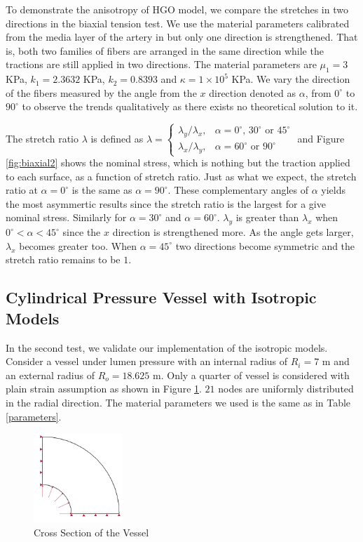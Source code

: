 To demonstrate the anisotropy of HGO model, we compare the stretches in two directions in the biaxial tension test. We use the material parameters calibrated from the media layer of the artery in \cite{Holzapfel2} but only one direction is strengthened. That is, both two families of fibers are arranged in the same direction while the tractions are still applied in two directions. The material parameters are $\mu_1 = 3$ KPa, $k_1 = 2.3632$ KPa, $k_2 = 0.8393$ and $\kappa = 1 \times 10^5$ KPa. We vary the direction of the fibers measured by the angle from the $x$ direction denoted as $\alpha$, from $0^\circ$ to $90^\circ$ to observe the trends qualitatively as there exists no theoretical solution to it. 

The stretch ratio $\lambda$ is defined as $\lambda = 
\begin{cases}
	\lambda_y/\lambda_x, & \text{$\alpha = 0^\circ$, $30^\circ$ or $45^\circ$} \\
	\lambda_x/\lambda_y, & \text{$\alpha = 60^\circ$ or $90^\circ$}
\end{cases}
$ 
and Figure \ref{fig:biaxial2} shows the nominal stress, which is nothing but the traction applied to each surface, as a function of stretch ratio. Just as what we expect, the stretch ratio at $\alpha = 0^\circ$ is the same as $\alpha = 90^\circ$. These complementary angles of $\alpha$ yields the most asymmertic results since the stretch ratio is the largest for a give nominal stress. Similarly for $\alpha = 30^\circ$ and $\alpha = 60^\circ$. 
$\lambda_y$ is greater than $\lambda_x$ when $0^\circ < \alpha < 45^\circ$ since the $x$ direction is strengthened more. As the angle gets larger, $\lambda_x$ becomes greater too. When $\alpha = 45^\circ$ two directions become symmetric and the stretch ratio remains to be $1$.
 

\subsection{Cylindrical Pressure Vessel with Isotropic Models}
\label{pressure_vessel}
In the second test, we validate our implementation of the isotropic models. Consider a vessel under lumen pressure with an internal radius of $R_i = 7$ m and an external radius of $R_o = 18.625$ m. Only a quarter of vessel is considered with plain strain assumption as shown in Figure \ref{fig:vessel_schematic}. $21$ nodes are uniformly distributed in the radial direction. The material parameters we used is the same as in Table \ref{parameters}. 
\begin{figure}[H]
	\centering
	\includegraphics[width=0.3\textwidth]{./figures/vessel_schematic.jpg}
	\caption{Cross Section of the Vessel}
	\label{fig:vessel_schematic}
\end{figure}

